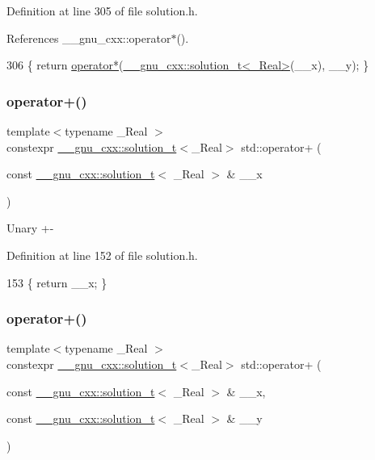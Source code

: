 Definition at line 305 of file solution.\+h.



References \+\_\+\+\_\+gnu\+\_\+cxx\+::operator$\ast$().


\begin{DoxyCode}
306     \{ \textcolor{keywordflow}{return} \hyperlink{namespacestd_ae82d1f9ca11a46b93a33f2f89ce71305}{operator*}(\hyperlink{namespace____gnu__cxx_ae20ea642de50eb361074c62676b0159c}{\_\_gnu\_cxx::solution\_t<\_Real>}(\_\_x), \_\_y); \}
\end{DoxyCode}
\mbox{\label{namespacestd_a49a4eaaa2e023275443b1854bc90c77d}} 
\subsubsection{\texorpdfstring{operator+()}{operator+()}\hspace{0.1cm}{\footnotesize\ttfamily [1/6]}}
{\footnotesize\ttfamily template$<$typename \+\_\+\+Real $>$ \\
constexpr \hyperlink{namespace____gnu__cxx_ae20ea642de50eb361074c62676b0159c}{\+\_\+\+\_\+gnu\+\_\+cxx\+::solution\+\_\+t}$<$\+\_\+\+Real$>$ std\+::operator+ (\begin{DoxyParamCaption}\item[{const \hyperlink{namespace____gnu__cxx_ae20ea642de50eb361074c62676b0159c}{\+\_\+\+\_\+gnu\+\_\+cxx\+::solution\+\_\+t}$<$ \+\_\+\+Real $>$ \&}]{\+\_\+\+\_\+x }\end{DoxyParamCaption})}

Unary +-\/ 

Definition at line 152 of file solution.\+h.


\begin{DoxyCode}
153     \{ \textcolor{keywordflow}{return} \_\_x; \}
\end{DoxyCode}
\mbox{\label{namespacestd_ad34e888e243a1ad8303966f3cfe7a690}} 
\subsubsection{\texorpdfstring{operator+()}{operator+()}\hspace{0.1cm}{\footnotesize\ttfamily [2/6]}}
{\footnotesize\ttfamily template$<$typename \+\_\+\+Real $>$ \\
constexpr \hyperlink{namespace____gnu__cxx_ae20ea642de50eb361074c62676b0159c}{\+\_\+\+\_\+gnu\+\_\+cxx\+::solution\+\_\+t}$<$\+\_\+\+Real$>$ std\+::operator+ (\begin{DoxyParamCaption}\item[{const \hyperlink{namespace____gnu__cxx_ae20ea642de50eb361074c62676b0159c}{\+\_\+\+\_\+gnu\+\_\+cxx\+::solution\+\_\+t}$<$ \+\_\+\+Real $>$ \&}]{\+\_\+\+\_\+x,  }\item[{const \hyperlink{namespace____gnu__cxx_ae20ea642de50eb361074c62676b0159c}{\+\_\+\+\_\+gnu\+\_\+cxx\+::solution\+\_\+t}$<$ \+\_\+\+Real $>$ \&}]{\+\_\+\+\_\+y }\end{DoxyParamCaption})}

